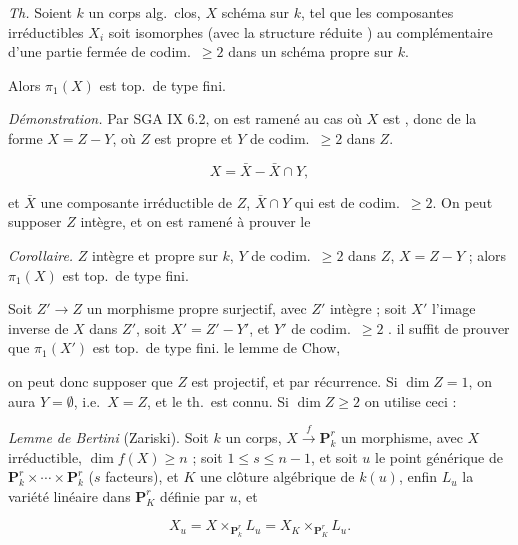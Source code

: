 \documentclass[11pt,a4paper]{article}
\begin{document}

\emph{Th.} Soient $k$ un corps alg.\ clos, $X$ schéma 
 sur $k$,  tel que les
composantes irréductibles $X_i$ soit isomorphes (avec la structure
réduite ) au  complémentaire
d'une partie fermée de codim.\ $\geq 2$ dans un schéma propre sur $k$.


Alors $\pi_1(X)$ est top.\ de type fini.

\emph{Démonstration.} Par SGA IX 6.2, on est ramené au cas où $X$ est
 , donc de la forme $X = Z - Y$, où $Z$ est
propre et $Y$ de codim.\ $\geq 2$ dans $Z$. \ill{} \ill{}

\[ X = \bar X - \bar X \cap Y, \]

et $\bar X$  une composante irréductible de $Z$,
$\bar X \cap Y$ qui est de codim.\ $\geq 2$. \ill{} On peut supposer $Z$
 intègre, et on est ramené à prouver le

\emph{Corollaire.} $Z$ intègre et propre sur $k$, $Y$ de codim.\ $\geq 2$
dans $Z$, $X = Z - Y$ ; alors $\pi_1(X)$ est top.\ de type fini.

Soit $Z' \to Z$ un morphisme propre surjectif, avec $Z'$ intègre ; soit $X'$
l'image inverse de $X$ dans $Z'$, soit $X' = Z' - Y'$, et $Y'$ de codim.\
$\geq 2$ . \ill{} il suffit de prouver que $\pi_1(X')$ est
top.\ de type fini. \uncertain{Par} le lemme de Chow,

on peut donc supposer que $Z$ est projectif,  et \ill{} par
récurrence. \add{$\dim Z \leq 0$, trivial.} Si $\dim Z = 1$, on aura
$Y = \emptyset$, i.e.\ $X = Z$, et le th.\ est connu. Si $\dim Z \geq 2$ on
utilise ceci :

\emph{Lemme de Bertini} (Zariski). Soit $k$ un corps, $X \xrightarrow{f}
\mathbf{P}^r_k$ un morphisme, avec $X$ irréductible, $\dim f(X) \geq n$ ;
soit $1 \leq s \leq n-1$, et soit $u$ le point générique de
$\mathbf{P}^r_k \times \cdots \times \mathbf{P}^r_k$ ($s$ facteurs), et $K$
une clôture algébrique de $k(u)$, enfin $L_u$ la variété linéaire dans
$\mathbf{P}^r_K$ définie par $u$, et

\[ X_u = X \times_{\mathbf{P}^r_k} L_u
       = X_K \times_{\mathbf{P}^r_K} L_u. \]
\end{document}
